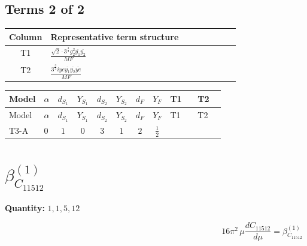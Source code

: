 \documentclass[8pt]{article}
\begin{document}
\begin{landscape}
\subsection*{Terms 2 of 2}
\begin{center}
\begin{tabular}{@{}c >{\raggedright\arraybackslash}p{0.82\linewidth}@{}}
\toprule
Column & Representative term structure \\
\midrule
T1 & \(\displaystyle \frac{\sqrt{2} \cdot 3^{\frac{3}{4}} g_{2}^{2} \overline{y_{1}} \overline{y_{2}}}{MF}\) \\
\midrule
T2 & \(\displaystyle \frac{3^{\frac{3}{4}} i ye \overline{y_{1}} \overline{y_{2}} \overline{ye}}{MF}\) \\
\midrule
\bottomrule
\end{tabular}
\end{center}
\smallskip
\tiny
\begin{longtable}{@{}llcccccc >{\raggedright\arraybackslash}p{0.21\linewidth} >{\raggedright\arraybackslash}p{0.21\linewidth}@{}}
\toprule
Model & $\alpha$ & $d_{S_1}$ & $Y_{S_1}$ & $d_{S_2}$ & $Y_{S_2}$ & $d_F$ & $Y_F$ & T1 & T2 \\
\midrule
\endfirsthead
\toprule
Model & $\alpha$ & $d_{S_1}$ & $Y_{S_1}$ & $d_{S_2}$ & $Y_{S_2}$ & $d_F$ & $Y_F$ & T1 & T2 \\
\midrule
\endhead
T3-A & $0$ & $1$ & $0$ & $3$ & $1$ & $2$ & $\frac{1}{2}$ & \scriptsize\adjustbox{max width=\linewidth}{$\begin{gathered} \frac{\sqrt{2} \cdot 3^{\frac{3}{4}} g_{2}^{2} \overline{y_{1}} \overline{y_{2}}}{3 MF}\end{gathered}$} & \scriptsize\adjustbox{max width=\linewidth}{$\begin{gathered} \frac{3^{\frac{3}{4}} i ye \overline{y_{1}} \overline{y_{2}} \overline{ye}}{12 MF}\end{gathered}$} \\
\midrule
\bottomrule
\end{longtable}
\clearpage
\section*{$\beta_{C_{11512}}^{(1)}$}
\noindent\textbf{Quantity: }$\mathrm{1,1,5,12}$\par\smallskip
\[16\pi^2\,\mu\frac{d C_{11512}}{d\mu}=\beta_{C_{11512}}^{(1)}\]

\end{landscape}
\end{document}
